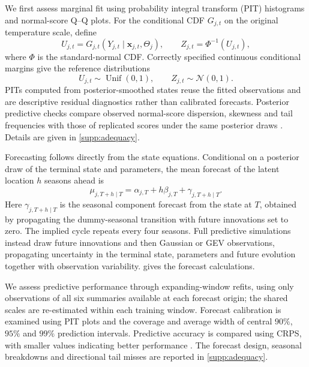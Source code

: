 \documentclass[11pt,a4paper]{article}
\newcommand{\N}{\mathcal N}
\begin{document}
	We first assess marginal fit using probability integral transform
	(PIT) histograms and normal-score Q--Q plots. For the conditional CDF
	\(G_{j,t}\) on the original temperature scale, define
	\begin{equation}\label{eq:pit-scores}
		U_{j,t}=G_{j,t}(Y_{j,t}\mid\bm x_{j,t},\Theta_j),
		\qquad Z_{j,t}=\Phi^{-1}(U_{j,t}),
	\end{equation}
	where \(\Phi\) is the standard-normal CDF. Correctly specified continuous
	conditional margins give the reference distributions
	\begin{equation}\label{eq:pit-reference}
		U_{j,t}\sim\operatorname{Unif}(0,1),
		\qquad Z_{j,t}\sim\N(0,1).
	\end{equation}
	PITs computed from posterior-smoothed states reuse the fitted observations
	and are descriptive residual diagnostics rather than calibrated forecasts.
	Posterior predictive checks compare observed normal-score dispersion,
	skewness and tail frequencies with those of replicated scores under the
	same posterior draws \citep{gelman1996}. Details are given in
	\cref{supp:adequacy}.
	
	Forecasting follows directly from the state equations. Conditional
	on a posterior draw of the terminal state and parameters, the mean
	forecast of the latent location \(h\) seasons ahead is
	\begin{equation}\label{eq:forecast-location}
		\mu_{j,T+h\mid T}
		=\alpha_{j,T}+h\beta_{j,T}+\gamma_{j,T+h\mid T}.
	\end{equation}
	Here \(\gamma_{j,T+h\mid T}\) is the seasonal component forecast from
	the state at \(T\), obtained by propagating the dummy-seasonal
	transition with future innovations set to zero. The implied cycle
	repeats every four seasons. Full predictive simulations instead draw
	future innovations and then Gaussian or GEV observations, propagating
	uncertainty in the terminal state, parameters and future evolution
	together with observation variability.  gives the
	forecast calculations.
	
	We assess predictive performance through expanding-window refits,
	using only observations of all six summaries available at each forecast
origin; the shared scales are re-estimated within each training window. Forecast
	calibration is examined using PIT plots and the coverage and average
	width of central \(90\%\), \(95\%\) and \(99\%\) prediction intervals.
	Predictive accuracy is compared using CRPS, with smaller values
	indicating better performance \citep{diebold1998,gneiting2007}.
	The forecast design, seasonal breakdowns and directional tail misses
	are reported in \cref{supp:adequacy}.
	
\end{document}
